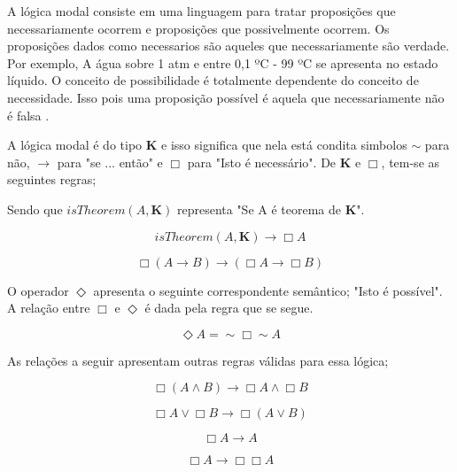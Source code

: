 A lógica modal consiste em uma linguagem para tratar proposições que necessariamente ocorrem e proposições que possivelmente ocorrem. Os proposições dados como necessarios são aqueles que necessariamente 
são verdade. Por exemplo, A água sobre 1 atm e entre 0,1 ºC - 99 ºC se apresenta no estado líquido. O conceito de possibilidade é totalmente dependente do conceito de necessidade. Isso pois 
uma proposição possível é aquela que necessariamente não é falsa \cite{modallogic}. 

A lógica modal é do tipo \textbf{K} e isso significa que nela está condita simbolos $ \sim $ para não, $ \rightarrow$ para "se ... então" e $\Box$ para "Isto é necessário". 
De \textbf{K} e $\Box$, tem-se as seguintes regras;

Sendo que $isTheorem(A,\textbf{K})$ representa "Se A é teorema de \textbf{K}". 

\begin{equation} 
isTheorem(A,\textbf{K}) \rightarrow \Box A
\end{equation}
\label{ktheorema}

\begin{equation} 
 \Box (A \rightarrow B) \rightarrow (\Box A \rightarrow \Box B) 
\end{equation}
\label{boxdist}

O operador $\Diamond$ apresenta o seguinte correspondente semântico; "Isto é possível". A relação entre $\Box$ e $\Diamond$ é dada pela regra que se segue.

\begin{equation} 
 \Diamond A = \sim\Box\sim A
\end{equation}
\label{dianotboxnota}

As relações a seguir apresentam outras regras válidas para essa lógica;

\begin{equation} 
 \Box (A \wedge B)  \rightarrow \Box A \wedge \Box B
\end{equation}
\label{boxand}

\begin{equation} 
 \Box A \vee \Box B \rightarrow \Box (A \vee B)
\end{equation}
\label{boxaor}

\begin{equation} 
 \Box A \rightarrow A
\end{equation}
\label{boxtoa}

\begin{equation} 
    \Box A \rightarrow \Box\Box A
\end{equation}
\label{aboxbox}

